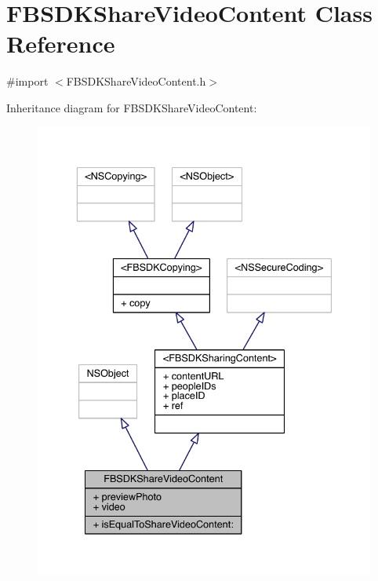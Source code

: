 \hypertarget{interface_f_b_s_d_k_share_video_content}{\section{F\-B\-S\-D\-K\-Share\-Video\-Content Class Reference}
\label{interface_f_b_s_d_k_share_video_content}
}


{\ttfamily \#import $<$F\-B\-S\-D\-K\-Share\-Video\-Content.\-h$>$}



Inheritance diagram for F\-B\-S\-D\-K\-Share\-Video\-Content\-:
\nopagebreak
\begin{figure}[H]
\begin{center}
\leavevmode
\includegraphics[width=336pt]{interface_f_b_s_d_k_share_video_content__inherit__graph}
\end{center}
\end{figure}


